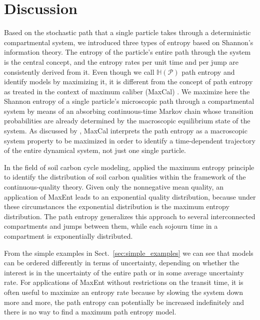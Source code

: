 \documentclass[smallextended]{svjour3}
\renewcommand{\H}{\mathbb{H}}
\begin{document}
\section{Discussion}
Based on the stochastic path that a single particle takes through a deterministic compartmental system, we introduced three types of entropy based on Shannon's information theory.
The entropy of the particle's entire path through the system is the central concept, and the entropy rates per unit time and per jump are consistently derived from it.
Even though we call $\H(\mathcal{P})$ path entropy and identify models by maximizing it, it is different from the concept of path entropy as treated in the context of maximum caliber (MaxCal) \citep{jaynes1985macroscopic, Roach2020}.
We maximize here the Shannon entropy of a single particle's microscopic path through a compartmental system by means of an absorbing continuous-time Markov chain whose transition probabilities are already determined by the macroscopic equilibrium state of the system.
As discussed by \citet{Presse2013RMP}, MaxCal interprets the path entropy as a macroscopic system property to be maximized in order to identify a time-dependent trajectory of the entire dynamical system, not just one single particle.

In the field of soil carbon cycle modeling, \citet{Agren2021BGC} applied the maximum entropy principle to identify the distribution of soil carbon qualities within the framework of the continuous-quality theory.
Given only the nonnegative mean quality, an application of MaxEnt leads to an exponential quality distribution, because under these circumstances the exponential distribution is the maximum entropy distribution.
The path entropy generalizes this approach to several interconnected compartments and jumps between them, while each sojourn time in a compartment is exponentially distributed.

From the simple examples in Sect.~\ref{sec:simple_examples} we can see that models can be ordered differently in terms of uncertainty, depending on whether the interest is in the uncertainty of the entire path or in some average uncertainty rate.
For applications of MaxEnt without restrictions on the transit time, it is often useful to maximize an entropy rate because by slowing the system down more and more, the path entropy can potentially be increased indefinitely and there is no way to find a maximum path entropy model.
\end{document}

